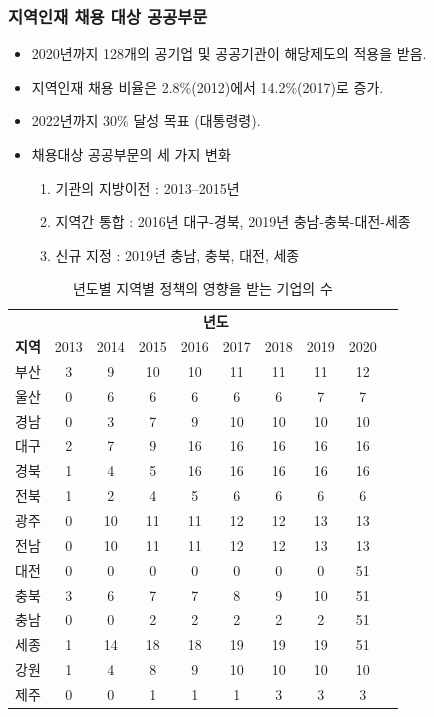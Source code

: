 \documentclass[aspectratio=169,xcolor=dvipsnames,handout]{beamer}
\begin{document}
\begin{frame}[allowframebreaks]
    \frametitle{지역인재 채용 대상 공공부문}
    \begin{itemize}[<+->]
        \item 2020년까지 128개의 공기업 및 공공기관이 해당제도의 적용을 받음. 
        \item 지역인재 채용 비율은 2.8\%(2012)에서 14.2\%(2017)로 증가.
        \item 2022년까지 30\% 달성 목표 (대통령령).
        \item 채용대상 공공부문의 세 가지 변화
        \begin{enumerate}
            \item 기관의 지방이전 : 2013--2015년
            \item 지역간 통합 : 2016년 대구-경북, 2019년 충남-충북-대전-세종
            \item 신규 지정 : 2019년 충남, 충북, 대전, 세종
        \end{enumerate}
    \end{itemize}
    \begin{table}[ht]
        \centering
        \tiny
        \begin{tabular}{lccccccccc}
        \toprule
        & \multicolumn{8}{c}{\textbf{년도}} \\
        \cline{2-9} 
        \textbf{지역} & 2013 & 2014 & 2015 & 2016 & 2017 & 2018 & 2019 & 2020 \\
        \midrule
        부산     & 3 & 9  & 10 & 10 & 11 & 11 & 11 & 12 \\
        울산     & 0 & 6  & 6  & 6  & 6  & 6  & 7  & 7  \\
        경남 & 0 & 3  & 7  & 9  & 10 & 10 & 10 & 10 \\
        대구     & 2 & 7  & 9  & 16 & 16 & 16 & 16 & 16 \\
        경북  & 1 & 4  & 5  & 16 & 16 & 16 & 16 & 16 \\
        전북   & 1 & 2  & 4  & 5  & 6  & 6  & 6  & 6  \\
        광주   & 0 & 10 & 11 & 11 & 12 & 12 & 13 & 13 \\
        전남    & 0 & 10 & 11 & 11 & 12 & 12 & 13 & 13 \\
        대전    & 0 & 0  & 0  & 0  & 0  & 0  & 0  & 51 \\
        충북  & 3 & 6  & 7  & 7  & 8  & 9  & 10 & 51 \\
        충남 & 0 & 0  & 2  & 2  & 2  & 2  & 2  & 51 \\
        세종    & 1 & 14 & 18 & 18 & 19 & 19 & 19 & 51 \\
        강원   & 1 & 4  & 8  & 9  & 10 & 10 & 10 & 10 \\
        제주      & 0 & 0  & 1  & 1  & 1  & 3  & 3  & 3  \\
        \bottomrule
        \end{tabular}
        \caption{년도별 지역별 정책의 영향을 받는 기업의 수}
    \end{table}
\end{frame}
\end{document}
